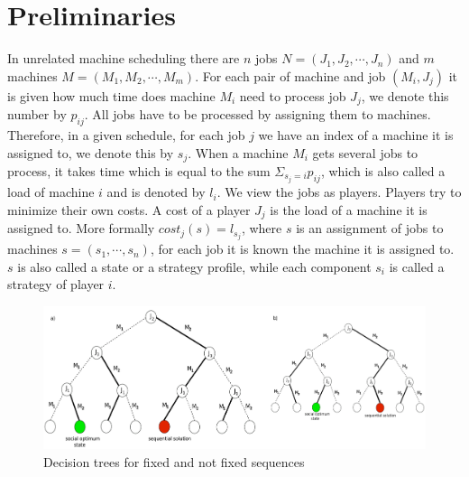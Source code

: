 \documentclass[12pt,a4paper]{article}
\theoremstyle{definition}
\theoremstyle{remark}
\begin{document}

\section{Preliminaries}\label{sec:preli}
In unrelated machine scheduling there are $n$ jobs $N=(J_1,J_2,\cdots,J_n)$ and $m$ machines $M = (M_1,M_2,\cdots, M_m)$. For each pair of machine and job $(M_i,J_j)$ it is given how much time does machine $M_i$ need to process job $J_j$, we denote this number by $p_{ij}$. All jobs have to be processed by assigning them to machines. Therefore, in a given schedule, for each job $j$ we have an index of a machine it is assigned to, we denote this by $s_j$.
When a machine $M_i$ gets several jobs to process, it takes time which is equal to the sum  $\Sigma_{s_j=i}p_{ij}$, which is also called a load of machine $i$ and is denoted by $l_i$. We view the jobs as players. Players try to minimize their own costs. A cost of a player $J_j$ is the load of a machine it is assigned to. More formally $cost_j(s) = l_{s_j}$, where $s$ is an assignment of jobs to machines $s = (s_1, \cdots, s_n)$, for each job it is known the machine it is assigned to. $s$ is also called a state or a strategy profile, while each component $s_i$ is called a strategy of player $i$.

\begin{figure}
	\centering
	\includegraphics[scale=.62]{decision_trees}
	\caption{Decision trees for fixed and not fixed sequences}
	\label{fig:decision_trees}
\end{figure}
\end{document}
